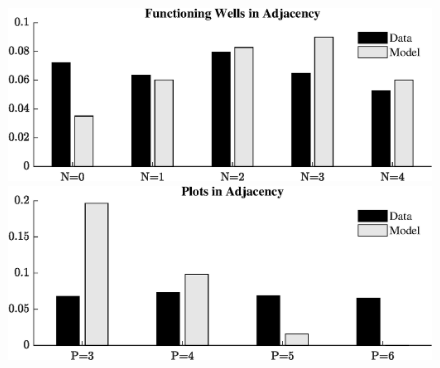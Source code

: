 \documentclass[hidelinks,12pt]{article}
\title{}
\author{}
\begin{document}
\newpage
\begin{figure}
\begin{center}
\includegraphics[scale=0.8]{model_fit2.eps}\\[20pt]
\includegraphics[scale=0.8]{model_fit4.eps}
\end{center}
\end{figure}
\end{document}

